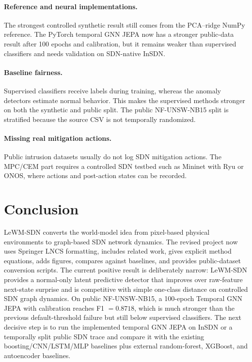 \documentclass[runningheads]{llncs}
\begin{document}
\paragraph{Reference and neural implementations.}
The strongest controlled synthetic result still comes from the PCA--ridge NumPy
reference. The PyTorch temporal GNN JEPA now has a stronger public-data result
after 100 epochs and calibration, but it remains weaker than supervised
classifiers and needs validation on SDN-native InSDN.

\paragraph{Baseline fairness.}
Supervised classifiers receive labels during training, whereas the anomaly
detectors estimate normal behavior. This makes the supervised methods stronger
on both the synthetic and public split. The public NF-UNSW-NB15 split is
stratified because the source CSV is not temporally randomized.

\paragraph{Missing real mitigation actions.}
Public intrusion datasets usually do not log SDN mitigation actions. The
MPC/CEM part requires a controlled SDN testbed such as Mininet with Ryu or
ONOS, where actions and post-action states can be recorded.

\section{Conclusion}

LeWM-SDN converts the world-model idea from pixel-based physical environments
to graph-based SDN network dynamics. The revised project now uses Springer
LNCS formatting, includes related work, gives explicit method equations,
adds figures, compares against baselines, and provides public-dataset
conversion scripts. The current positive result is deliberately narrow:
LeWM-SDN provides a normal-only latent predictive detector that improves over
raw-feature next-state surprise and is competitive with simple one-class
distance on controlled SDN graph dynamics. On public NF-UNSW-NB15, a 100-epoch
Temporal GNN JEPA with calibration reaches F1 $=0.8718$, which is much stronger
than the previous default-threshold failure but still below supervised
classifiers. The next decisive step is to run the implemented temporal GNN JEPA
on InSDN or a temporally split public SDN trace and compare it with the
existing boosting/CNN/LSTM/MLP baselines plus external random-forest, XGBoost,
and autoencoder baselines.
\end{document}

